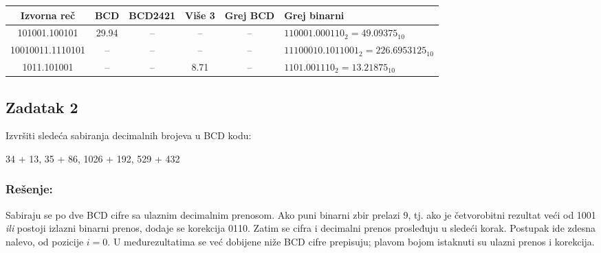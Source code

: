 \documentclass[a4paper,11pt]{article}
\numberwithin{equation}{section}
\newcommand{\redlinija}{\arrayrulecolor{black!28}\specialrule{0.3pt}{2pt}{2pt}\arrayrulecolor{black}}
\begin{document}
\begin{center}\begin{minipage}{\linewidth}\centering\captionsetup{hypcap=false}
\label{tab:dekodiranje}

\begingroup\setlength{\tabcolsep}{4pt}
\begin{adjustbox}{max width=\linewidth}\begin{tabular}{ccccc>{\centering\arraybackslash}p{6.3cm}}\toprule
Izvorna reč & BCD & BCD2421 & Više 3 & Grej BCD & Grej binarni\\\midrule
101001.100101 & 29.94 & -- & -- & -- & $110001.000110_2=49.09375_{10}$\\
\redlinija
10010011.1110101 & -- & -- & -- & -- & $11100010.1011001_2=226.6953125_{10}$\\
\redlinija
1011.101001 & -- & -- & 8.71 & -- & $1101.001110_2=13.21875_{10}$\\
\bottomrule\end{tabular}\end{adjustbox}\endgroup
\end{minipage}\end{center}




\FloatBarrier
\subsection{Zadatak 2}\label{sec:2.2}


Izvršiti sledeća sabiranja decimalnih brojeva u BCD kodu:



34 + 13, 35 + 86, 1026 + 192, 529 + 432



\subsubsection*{Rešenje:}


Sabiraju se po dve BCD cifre sa ulaznim decimalnim prenosom. Ako puni binarni zbir prelazi 9, tj. ako je četvorobitni rezultat veći od 1001 \emph{ili} postoji izlazni binarni prenos, dodaje se korekcija 0110. Zatim se cifra i decimalni prenos prosleđuju u sledeći korak. Postupak ide zdesna nalevo, od pozicije $i=0$. U međurezultatima se već dobijene niže BCD cifre prepisuju; plavom bojom istaknuti su ulazni prenos i korekcija.
\end{document}
